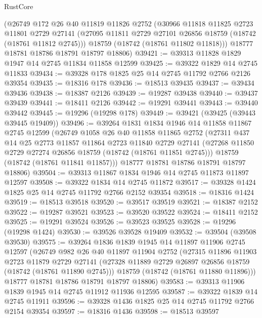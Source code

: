\begin{lexlean}{RustCore}
\begin{coremodule}
    (@26749
      @172
      @26
      @40
      @11819
      @11826
      @2752
      (@30966
        @11818
        @11825
        @2723
        @11801
        @2729
        @27141
        (@27095 @11811 @2729 @27101 @26856 @18759 (@18742 (@18761 @11812 @2745)))
        @18759
        (@18742 (@18761 @11802 @11818)))
      @18777
      @18781
      @18786
      @18791
      @18797
      @18806)
@39421 := @39313 @11828 @1829 @1947 @14 @2745 @11834 @11858 @12599
@39425 := @39322 @1829 @14 @2745 @11833
@39434 := @39328 @178 @1825 @25 @14 @2745 @11792 @2766 @2126 @39354
@39435 := @18316 @178
@39436 := @18513 @39435
@39437 := @39434 @39436
@39438 := @18387 @2126
@39439 := @19287 @39438
@39440 := @39437 @39439
@39441 := @18411 @2126
@39442 := @19291 @39441
@39443 := @39440 @39442
@39445 := @19296 (@19298 @178)
@39449 := @39421 (@39425 (@39443 @39445 @19409))
@39496 := @39264
    @1831
    @1834
    @1946
    @14
    @11858
    @11867
    @2745
    @12599
    (@26749
      @1058
      @26
      @40
      @11858
      @11865
      @2752
      (@27311
        @437
        @14
        @25
        @2773
        @11857
        @11864
        @2723
        @11840
        @2729
        @27141
        (@27268 @11850 @2729 @27274 @26856 @18759 (@18742 (@18761 @11851 @2745)))
        @18759
        (@18742 (@18761 @11841 @11857)))
      @18777
      @18781
      @18786
      @18791
      @18797
      @18806)
@39504 := @39313 @11867 @1834 @1946 @14 @2745 @11873 @11897 @12597
@39508 := @39322 @1834 @14 @2745 @11872
@39517 := @39328 @1424 @1825 @25 @14 @2745 @11792 @2766 @2152 @39354
@39518 := @18316 @1424
@39519 := @18513 @39518
@39520 := @39517 @39519
@39521 := @18387 @2152
@39522 := @19287 @39521
@39523 := @39520 @39522
@39524 := @18411 @2152
@39525 := @19291 @39524
@39526 := @39523 @39525
@39528 := @19296 (@19298 @1424)
@39530 := @39526 @39528 @19409
@39532 := @39504 (@39508 @39530)
@39575 := @39264
    @1836
    @1839
    @1945
    @14
    @11897
    @11906
    @2745
    @12597
    (@26749
      @982
      @26
      @40
      @11897
      @11904
      @2752
      (@27315
        @11896
        @11903
        @2723
        @11879
        @2729
        @27141
        (@27328 @11889 @2729 @26897 @26856 @18759 (@18742 (@18761 @11890 @2745)))
        @18759
        (@18742 (@18761 @11880 @11896)))
      @18777
      @18781
      @18786
      @18791
      @18797
      @18806)
@39583 := @39313 @11906 @1839 @1945 @14 @2745 @11912 @11936 @12595
@39587 := @39322 @1839 @14 @2745 @11911
@39596 := @39328 @1436 @1825 @25 @14 @2745 @11792 @2766 @2154 @39354
@39597 := @18316 @1436
@39598 := @18513 @39597

\end{coremodule}
\end{lexlean}
